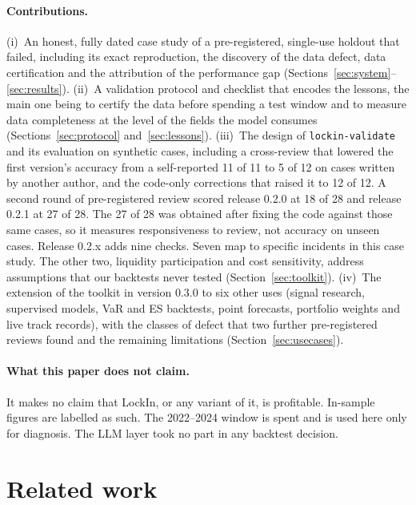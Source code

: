 \documentclass[11pt]{article}
\begin{document}
\paragraph{Contributions.} (i)~An honest, fully dated case study of a pre-registered, single-use holdout that failed, including its exact reproduction, the discovery of the data defect, data certification and the attribution of the performance gap (Sections~\ref{sec:system}--\ref{sec:results}). (ii)~A validation protocol and checklist that encodes the lessons, the main one being to certify the data before spending a test window and to measure data completeness at the level of the fields the model consumes (Sections~\ref{sec:protocol} and~\ref{sec:lessons}). (iii)~The design of \texttt{lockin-validate} and its evaluation on synthetic cases, including a cross-review that lowered the first version's accuracy from a self-reported 11 of 11 to 5 of 12 on cases written by another author, and the code-only corrections that raised it to 12 of 12. A second round of pre-registered review scored release 0.2.0 at 18 of 28 and release 0.2.1 at 27 of 28. The 27 of 28 was obtained after fixing the code against those same cases, so it measures responsiveness to review, not accuracy on unseen cases. Release 0.2.x adds nine checks. Seven map to specific incidents in this case study. The other two, liquidity participation and cost sensitivity, address assumptions that our backtests never tested (Section~\ref{sec:toolkit}). (iv)~The extension of the toolkit in version 0.3.0 to six other uses (signal research, supervised models, VaR and ES backtests, point forecasts, portfolio weights and live track records), with the classes of defect that two further pre-registered reviews found and the remaining limitations (Section~\ref{sec:usecases}).

\paragraph{What this paper does not claim.} It makes no claim that LockIn, or any variant of it, is profitable. In-sample figures are labelled as such. The 2022--2024 window is spent and is used here only for diagnosis. The LLM layer took no part in any backtest decision.

\section{Related work}\label{sec:related}
\end{document}
